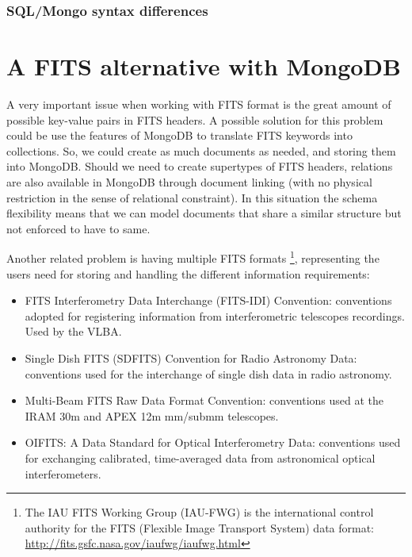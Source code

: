 \subsubsection{SQL/Mongo syntax differences}





\section{A FITS alternative with MongoDB}

A very important issue when working with FITS format is the great amount of possible key-value pairs in FITS headers. A possible solution for this problem could be use the features of MongoDB to translate FITS keywords into collections. So, we could create as much documents as needed, and storing them into MongoDB. Should we need to create supertypes of FITS headers, relations are also available in MongoDB through document linking (with no physical restriction in the sense of relational constraint). In this situation the schema flexibility means that we can model documents that share a similar structure but not enforced to have to same.

Another related problem is having multiple FITS formats \footnote{The IAU FITS Working Group (IAU-FWG) is the international control authority for the FITS (Flexible Image Transport System) data format: \url{http://fits.gsfc.nasa.gov/iaufwg/iaufwg.html}}, representing the users need for storing and handling the different information requirements:

\begin{itemize}
\item FITS Interferometry Data Interchange (FITS-IDI) Convention: conventions adopted for registering information from interferometric telescopes recordings. Used by the VLBA.
\item Single Dish FITS (SDFITS) Convention for Radio Astronomy Data: conventions used for the interchange of single dish data in radio astronomy. 
\item Multi-Beam FITS Raw Data Format Convention: conventions used at the IRAM 30m and APEX 12m mm/submm telescopes.
\item OIFITS: A Data Standard for Optical Interferometry Data: conventions used for exchanging calibrated, time-averaged data from astronomical optical interferometers.
\end{itemize}


